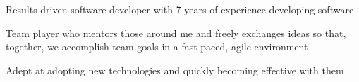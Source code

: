 %
    \begin{itemize*}
        \item Results-driven software developer with 7 years of experience developing software
        \item Team player who mentors those around me and freely exchanges ideas so that, together, we accomplish team goals in a fast-paced, agile environment
        \item Adept at adopting new technologies and quickly becoming effective with them
    \end{itemize*}
